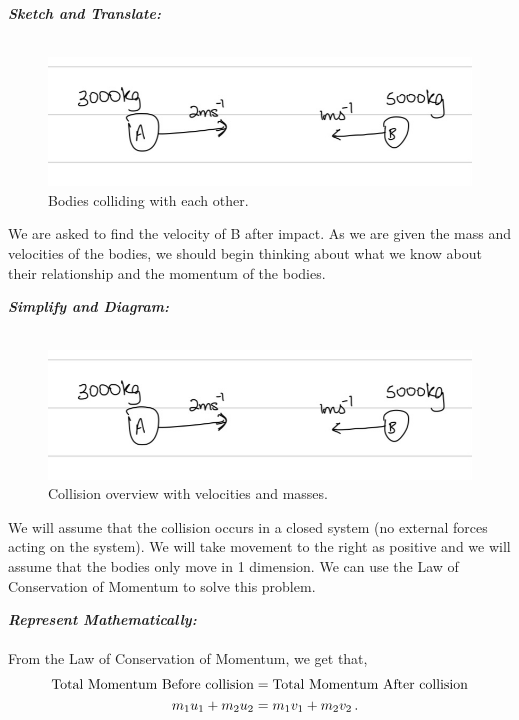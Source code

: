 \begin{subquestions}
\begin{subsubquestions}
\textbf{\textit{Sketch and Translate:}} \\ \\
\begin{figure}[H]
	\begin{center}
		\includegraphics[scale=0.25]{../2016/figures/2016q6-3}
		\caption{\label{2016:q6:Sketch3} Bodies colliding with each other.}
	\end{center}
\end{figure}	
We are asked to find the velocity of B after impact. As we are given the mass and velocities of the bodies, we should begin thinking about what we know about their relationship and the momentum of the bodies.




\textbf{\textit{Simplify and Diagram:}} \\ \\
\begin{figure}[H]
	\begin{center}
		\includegraphics[scale=0.25]{../2016/figures/2016q6-3}
		\caption{\label{2016:q6:Diagram3} Collision overview with velocities and masses.}
	\end{center}
\end{figure}
We will assume that the collision occurs in a closed system (no external forces acting on the system). We will take movement to the right as positive and we will assume that the bodies only move in 1 dimension. We can use the Law of Conservation of Momentum to solve this problem.




\textbf{\textit{Represent Mathematically:}} \\ \\
From the Law of Conservation of Momentum, we get that,
\begin{align}
	\text{Total Momentum Before collision} & = \text{Total Momentum After collision} \nonumber \\
	m_1u_1 + m_2u_2 & = m_1v_1 + m_2v_2 \,.
\end{align}





\end{subsubquestions}
\end{subquestions}

